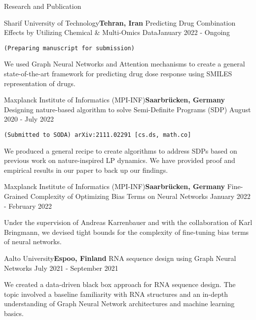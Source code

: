 \documentclass{resume} %
\begin{document}
\begin{rSection}{Research and Publication}


\begin{rSubsection}{Sharif University of Technology}{\textcolor{Black!70}{\bf Tehran, Iran}}
{Predicting Drug Combination Effects by Utilizing Chemical \& Multi-Omics Data}{\textcolor{Black!70}{January 2022 - Ongoing}}
\item {\tt (Preparing manuscript for submission)}
\begin{small}
\item We used Graph Neural Networks and Attention mechanisms to create a general state-of-the-art framework for predicting drug dose response using SMILES representation of drugs.
\end{small}
\end{rSubsection}


\begin{rSubsection}{Maxplanck Institute of Informatics (MPI-INF)}{\textcolor{Black!70}{\bf Saarbrücken, Germany}}
{Designing nature-based algorithm to solve Semi-Definite Programs (SDP)}
{\textcolor{Black!70}{August 2020 - July 2022}}
\item {\tt(Submitted to SODA) arXiv:2111.02291 [cs.ds, math.co]} \begin{small}
\item We produced a general recipe to create algorithms to address SDPs based on previous work on nature-inspired LP dynamics. We have provided proof and empirical results in our paper to back up our findings.
\end{small}
\end{rSubsection}
\begin{rSubsection}{Maxplanck Institute of Informatics (MPI-INF)}{\textcolor{Black!70}{\bf Saarbrücken, Germany}}
{Fine-Grained Complexity of Optimizing Bias Terms on Neural Networks}
{\textcolor{Black!70}{January 2022 - February 2022}}
\begin{small}
\item Under the supervision of Andreas Karrenbauer and with the collaboration of Karl Bringmann, we devised tight bounds for the complexity of fine-tuning bias terms of neural networks.
\end{small}
\end{rSubsection}

\begin{rSubsection}{Aalto University}{\textcolor{Black!70}{\bf Espoo, Finland}}
{RNA sequence design using Graph Neural Networks}
{\textcolor{Black!70}{July 2021 - September 2021}}{}
\begin{small}
\item We created a data-driven black box approach for RNA sequence design. The topic involved a baseline familiarity with RNA structures and an in-depth understanding of Graph Neural Network architectures and machine learning basics.
\end{small}
\end{rSubsection}

\end{rSection}
\end{document}
